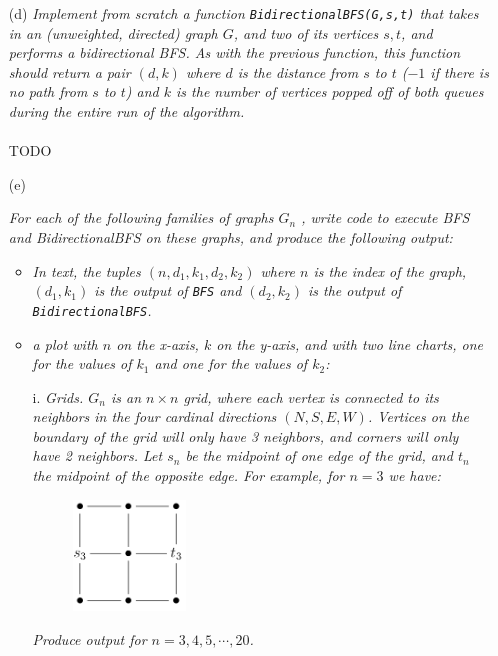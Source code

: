 \documentclass[12pt]{article} \setlength{\oddsidemargin}{0in}
\begin{document}
\begin{enumerate}
\item[(d)]{\textit{Implement from scratch a function \texttt{BidirectionalBFS(G,s,t)} that takes in an (unweighted, directed) graph $G$, and two of its vertices $s,t$, and performs a bidirectional BFS. As with the previous function, this function should return a pair
$(d, k)$ where $d$ is the distance from $s$ to $t$ ($-1$ if there is no path from $s$ to $t$) and $k$ is the number of vertices popped off of both queues during the entire run of the
algorithm.}}
  \\\\
  TODO
  \\
\item[(e)]{\textit{For each of the following families of graphs $G_n$ , write code to execute BFS and BidirectionalBFS on these graphs, and produce the following output:}
    \begin{itemize}
    \item \textit{In text, the tuples $(n, d_1, k_1, d_2, k_2)$ where $n$ is the index of the graph, $(d_1, k_1)$ is the output of \texttt{BFS} and $(d_2, k_2)$ is the output of \texttt{BidirectionalBFS}.}
    \item \textit{a plot with $n$ on the x-axis, $k$ on the y-axis, and with two line charts, one for the values of $k_1$ and one for the values of $k_2$:}
    \end{itemize}
    \begin{enumerate}
    \item[i.] \textit{Grids. $G_n$ is an $n \times n$ grid, where each vertex is connected to its neighbors in the four cardinal directions $(N,S,E,W)$. Vertices on the boundary of the grid
will only have 3 neighbors, and corners will only have 2 neighbors. Let $s_n$
be the midpoint of one edge of the grid, and $t_n$ the midpoint of the opposite
edge. For example, for $n = 3$ we have:}

\begin{figure}[h]
  \centering \includegraphics[width=0.3\textwidth]{P41}
\end{figure}

\textit{Produce output for $n = 3, 4, 5, \cdots, 20$.}


\end{enumerate}}
\end{enumerate}
\end{document}
